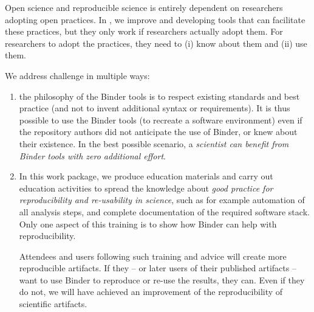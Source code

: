 \begin{workpackage}[id=education,wphases=0-36!1,swsites,
  title=Education and Dissemination,
  short=Education,
  lead=IFR,
  IFRRM=10,
  MPRM=6,
  SRLRM=7,
  QSRM=3,
  UIORM=9
]
\begin{wpdescription}

  Open science and reproducible science is entirely dependent on researchers
  adopting open practices. In \TheProject, we improve and developing tools that
  can facilitate these practices, but they only work if researchers actually adopt
  them. For researchers to adopt the practices, they need to (i) know about them
  and (ii) use them.

  We address challenge in multiple ways:
  \begin{enumerate}
    \item the philosophy of the Binder tools is to respect existing standards and
      best practice (and not to invent additional syntax or requirements). It is
      thus possible to use the Binder tools (to recreate a software environment)
      even if the repository authors did not anticipate the use of Binder, or
      knew about their existence. In the best possible scenario, a
      \emph{scientist can benefit from Binder tools with zero additional effort}.

    \item In this work package, we produce education materials and carry out
      education activities to spread the knowledge about \emph{good practice for
        reproducibility and re-usability in science}, such as for example
      automation of all analysis steps, and complete documentation of the
      required software stack. Only one aspect of this training is to show how
      Binder can help with reproducibility.

      Attendees and users following such training and advice will create more
      reproducible artifacts. If they -- or later users of their published
      artifacts -- want to use Binder to reproduce or re-use the results, they
      can. Even if they do not, we will have achieved an improvement of the
      reproducibility of scientific artifacts.
  \end{enumerate}



\end{wpdescription}
\end{workpackage}
